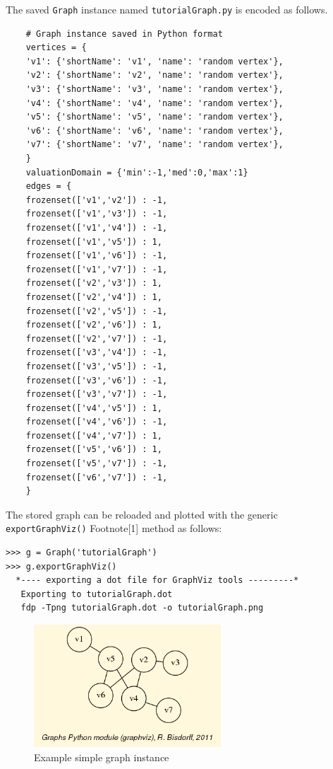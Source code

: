 The saved \texttt{Graph} instance named \texttt{tutorialGraph.py} is encoded as follows.
\begin{lstlisting}
    # Graph instance saved in Python format
    vertices = {
    'v1': {'shortName': 'v1', 'name': 'random vertex'},
    'v2': {'shortName': 'v2', 'name': 'random vertex'},
    'v3': {'shortName': 'v3', 'name': 'random vertex'},
    'v4': {'shortName': 'v4', 'name': 'random vertex'},
    'v5': {'shortName': 'v5', 'name': 'random vertex'},
    'v6': {'shortName': 'v6', 'name': 'random vertex'},
    'v7': {'shortName': 'v7', 'name': 'random vertex'},
    }
    valuationDomain = {'min':-1,'med':0,'max':1}
    edges = {
    frozenset(['v1','v2']) : -1, 
    frozenset(['v1','v3']) : -1, 
    frozenset(['v1','v4']) : -1, 
    frozenset(['v1','v5']) : 1, 
    frozenset(['v1','v6']) : -1, 
    frozenset(['v1','v7']) : -1, 
    frozenset(['v2','v3']) : 1, 
    frozenset(['v2','v4']) : 1, 
    frozenset(['v2','v5']) : -1, 
    frozenset(['v2','v6']) : 1, 
    frozenset(['v2','v7']) : -1, 
    frozenset(['v3','v4']) : -1, 
    frozenset(['v3','v5']) : -1, 
    frozenset(['v3','v6']) : -1, 
    frozenset(['v3','v7']) : -1, 
    frozenset(['v4','v5']) : 1, 
    frozenset(['v4','v6']) : -1, 
    frozenset(['v4','v7']) : 1, 
    frozenset(['v5','v6']) : 1, 
    frozenset(['v5','v7']) : -1, 
    frozenset(['v6','v7']) : -1, 
    }
\end{lstlisting}

The stored graph can be reloaded and plotted with the generic \\
\texttt{exportGraphViz()} Footnote[1] method as follows:
\begin{lstlisting}
>>> g = Graph('tutorialGraph')
>>> g.exportGraphViz()
  *---- exporting a dot file for GraphViz tools ---------*
   Exporting to tutorialGraph.dot
   fdp -Tpng tutorialGraph.dot -o tutorialGraph.png
\end{lstlisting}
\begin{figure}[h]
\sidecaption
\includegraphics[width=7cm]{Figures/tutorialGraph.png}
\caption{Example simple graph instance} 
\label{fig:21.1}       %
\end{figure}

